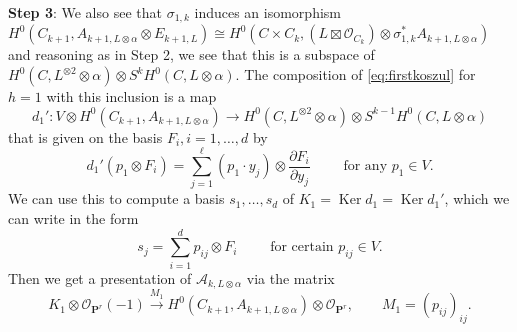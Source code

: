 \documentclass[12pt]{amsart}
\numberwithin{equation}{section}
\numberwithin{thmcounter}{section}
\theoremstyle{definition}
\theoremstyle{claim}
\newcommand{\nP}{\mathbf{P}}
\newcommand{\sO}{\mathscr{O}}
\begin{document}
\noindent
\textbf{Step 3}: We also see that $\sigma_{1,k}$ induces an isomorphism $H^0(C_{k+1},A_{k+1,L\otimes \alpha} \otimes E_{k+1,L}) \cong H^0(C\times C_k,(L\boxtimes \sO_{C_k}) \otimes \sigma_{1,k}^*A_{k+1,L\otimes \alpha})$ and reasoning as in Step 2, we see that  this is a subspace of $H^0(C,L^{\otimes 2}\otimes \alpha) \otimes S^kH^0(C,L\otimes \alpha)$. The composition of \eqref{eq:firstkoszul} for $h=1$ with this inclusion is a map
\[ d_1'\colon   V\otimes H^0(C_{k+1},A_{k+1,L\otimes \alpha}) \longrightarrow  H^0(C,L^{\otimes 2}\otimes \alpha) \otimes S^{k-1}H^0(C,L\otimes \alpha) \]
that is given on the basis $F_i,i=1,\dots,d$ by
\[ d_1'(p_1 \otimes F_i) =  \sum_{j=1}^{\ell}  (p_1\cdot y_j) \otimes \frac{ \partial F_i}{\partial y_j} \qquad \text{ for any } p_1\in V. \]
We can use this to compute a basis $s_1,\dots,s_d$ of $K_1 = \operatorname{Ker} d_1 = \operatorname{Ker} d_1'$, which we can write in the form
\[ s_j = \sum_{i=1}^{d} p_{ij} \otimes F_{i} \qquad \text{ for certain } p_{ij}\in V. \]
Then we get a presentation of $\mathscr{A}_{k,L\otimes \alpha}$ via the matrix
\[ K_{1} \otimes \sO_{\nP^r}(-1) \xrightarrow{M_1} H^0(C_{k+1},A_{k+1,L\otimes \alpha})\otimes \sO_{\nP^r}, \qquad M_1 = \left( p_{ij} \right)_{ij}. \]
\end{document}
